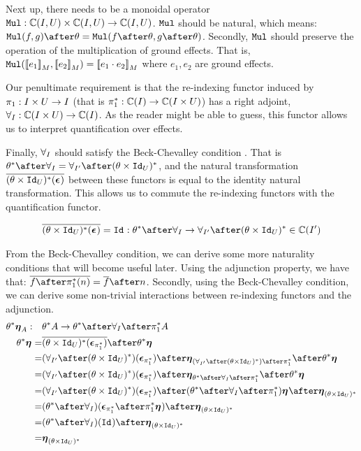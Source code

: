 \documentclass{Report}
\begin{document}
Next up, there needs to be a monoidal operator $\texttt{Mul}: \mathbb{C}(I, U) \times \mathbb{C}(I, U) \rightarrow \mathbb{C}(I, U)$. $\texttt{Mul}$ should be natural, which means: $\Mul(f, g)\after\theta = \Mul(f\after\theta, g\after\theta)$. Secondly, $\texttt{Mul}$ should preserve the operation of the multiplication of ground effects. That is, $\texttt{Mul}({\bf [\![}e_1{\bf ]\!]}_M,{\bf [\![}e_2{\bf ]\!]}_M) = {\bf [\![}e_1\cdot e_2{\bf ]\!]}_M$ where $e_1, e_2$ are ground effects.

Our penultimate requirement is that the re-indexing functor  induced by $\pi_1: I\times U\rightarrow I$ (that is $\pi_1^*: \mathbb{C}(I) \rightarrow \mathbb{C}(I\times U)$) has a right adjoint, $\forall_I: \mathbb{C}(I\times U) \rightarrow \mathbb{C}(I)$. As the reader might be able to guess, this functor allows us to interpret quantification over effects.

Finally, $\forall_I$ should satisfy the Beck-Chevalley condition . That is $\theta\star\after\allI = \allII\after(\theta\times\Id{U})\star$, and the natural transformation $\overline{(\theta\times\texttt{Id}_{U})^*(\boldsymbol{\epsilon}_{})}$ between these functors is equal to the identity natural transformation. This allows us to commute the re-indexing functors with the quantification functor.

\begin{align}
    \bar{(\theta\times\Id{U})\star(\counit{})} = \Id{}: \theta\star\after\allI \rightarrow \allII\after(\theta\times\Id{U})\star\in \C(I')
\end{align}

From the Beck-Chevalley condition, we can derive some more naturality conditions that will become useful later.
Using the adjunction property, we have that: $\bar{f\after\pstar(n)} = \bar{f}\after n$. Secondly, using the Beck-Chevalley condition, we can derive some non-trivial interactions between re-indexing functors and the adjunction.  
    \begin{align}
        \theta\star\unit{A}:\quad&\theta\star A \rightarrow \theta\star\after\allI\after\pstar A\\
        \theta\star\unit{} =& \bar{(\theta\times\Id{U})\star(\counit{\pstar})}\after\theta\star\unit{}\\
        =& (\allII\after(\theta\times\Id{U})\star)(\counit{\pstar})\after\unit{(\allII\after(\theta\times\Id{U})\star)\after\pstar}\after\theta\star\unit{}\\
        = & (\allII\after(\theta\times\Id{U})\star)(\counit{\pstar})\after\unit{\theta\star\after\allI\after\pstar}\after\theta\star\unit{}\\
        = & (\allII\after(\theta\times\Id{U})\star)(\counit{\pstar}) \after(\theta\star\after\allI\after\pstar)\unit{} \after\unit{(\theta\times\Id{U})\star}\\
        = & (\theta\star\after\allI)(\counit{\pstar}
        \after\pstar\unit{})\after\unit{(\theta\times\Id{U})\star}\\
        = & (\theta\star\after\allI)(\Id{})\after\unit{(\theta\times\Id{U})\star}\\
        = & \unit{(\theta\times\Id{U})\star}
    \end{align}
\end{document}
